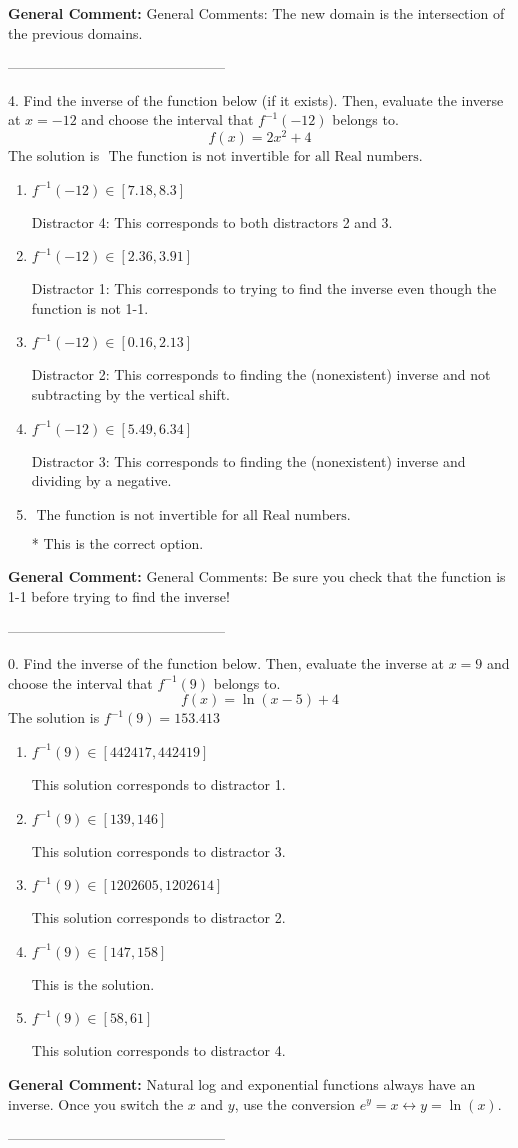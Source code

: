 \documentclass{extbook}[14pt]
\begin{document}
\textbf{General Comment:} General Comments: The new domain is the intersection of the previous domains. 

-----------------------------------------------

4. Find the inverse of the function below (if it exists). Then, evaluate the inverse at $x = -12$ and choose the interval that $f^{-1}(-12)$ belongs to.
\[ f(x) = 2 x^2 + 4 \] 
The solution is $ \text{ The function is not invertible for all Real numbers. } $ 

\begin{enumerate}[label=\Alph*.] 
\item $ f^{-1}(-12) \in [7.18, 8.3] $ 

  Distractor 4: This corresponds to both distractors 2 and 3. 
\item $ f^{-1}(-12) \in [2.36, 3.91] $ 

  Distractor 1: This corresponds to trying to find the inverse even though the function is not 1-1.  
\item $ f^{-1}(-12) \in [0.16, 2.13] $ 

  Distractor 2: This corresponds to finding the (nonexistent) inverse and not subtracting by the vertical shift. 
\item $ f^{-1}(-12) \in [5.49, 6.34] $ 

  Distractor 3: This corresponds to finding the (nonexistent) inverse and dividing by a negative. 
\item $ \text{ The function is not invertible for all Real numbers. } $ 

 * This is the correct option. 
\end{enumerate} 
 
\textbf{General Comment:} General Comments: Be sure you check that the function is 1-1 before trying to find the inverse! 

-----------------------------------------------

0. Find the inverse of the function below. Then, evaluate the inverse at $x = 9$ and choose the interval that $f^{-1}(9)$ belongs to.
\[ f(x) = \ln{(x-5)}+4 \] 
The solution is $ f^{-1}(9) = 153.413 $ 

\begin{enumerate}[label=\Alph*.] 
\item $ f^{-1}(9) \in [442417, 442419] $ 

  This solution corresponds to distractor 1. 
\item $ f^{-1}(9) \in [139, 146] $ 

  This solution corresponds to distractor 3. 
\item $ f^{-1}(9) \in [1202605, 1202614] $ 

  This solution corresponds to distractor 2. 
\item $ f^{-1}(9) \in [147, 158] $ 

  This is the solution. 
\item $ f^{-1}(9) \in [58, 61] $ 

  This solution corresponds to distractor 4. 
\end{enumerate} 
 
\textbf{General Comment:} Natural log and exponential functions always have an inverse. Once you switch the $x$ and $y$, use the conversion $ e^y = x \leftrightarrow y=\ln(x)$. 

-----------------------------------------------
\end{document}
